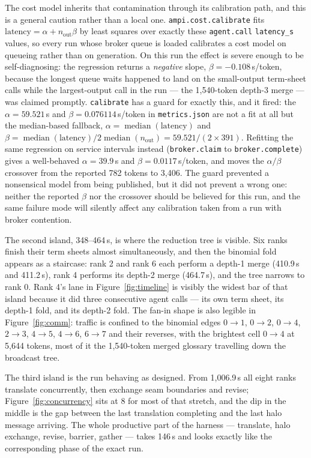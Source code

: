 \documentclass[11pt]{article}
\begin{document}
The cost model inherits that contamination through its calibration path, and this is a general
caution rather than a local one. \texttt{ampi.cost.calibrate} fits $\text{latency} =
\alpha + n_{\text{out}}\beta$ by least squares over exactly these \texttt{agent.call}
\texttt{latency\_s} values, so every run whose broker queue is loaded calibrates a cost model on
queueing rather than on generation. On this run the effect is severe enough to be
self-diagnosing: the regression returns a \emph{negative} slope, $\beta=-0.108$\,s/token,
because the longest queue waits happened to land on the small-output term-sheet calls while the
largest-output call in the run --- the 1{,}540-token depth-3 merge --- was claimed promptly.
\texttt{calibrate} has a guard for exactly this, and it fired: the $\alpha=59.521$\,s and
$\beta=0.076114$\,s/token in \texttt{metrics.json} are not a fit at all but the median-based
fallback, $\alpha=\operatorname{median}(\text{latency})$ and
$\beta=\operatorname{median}(\text{latency})/2\operatorname{median}(n_{\text{out}})
= 59.521/(2\times391)$. Refitting the same regression on service intervals instead
(\texttt{broker.claim} to \texttt{broker.complete}) gives a well-behaved $\alpha=39.9$\,s and
$\beta=0.0117$\,s/token, and moves the $\alpha/\beta$ crossover from the reported 782 tokens to
3{,}406. The guard prevented a nonsensical model from being published, but it did not prevent a
wrong one: neither the reported $\beta$ nor the crossover should be believed for this run, and
the same failure mode will silently affect any calibration taken from a run with broker
contention.

The second island, 348--464\,s, is where the reduction tree is visible. Six ranks finish their
term sheets almost simultaneously, and then the binomial fold appears as a staircase: rank 2 and
rank 6 each perform a depth-1 merge (410.9\,s and 411.2\,s), rank 4 performs its depth-2 merge
(464.7\,s), and the tree narrows to rank 0. Rank 4's lane in Figure~\ref{fig:timeline} is
visibly the widest bar of that island because it did three consecutive agent calls --- its own
term sheet, its depth-1 fold, and its depth-2 fold. The fan-in shape is also legible in
Figure~\ref{fig:comm}: traffic is confined to the binomial edges $0\!\to\!1$, $0\!\to\!2$,
$0\!\to\!4$, $2\!\to\!3$, $4\!\to\!5$, $4\!\to\!6$, $6\!\to\!7$ and their reverses, with the
brightest cell $0\!\to\!4$ at 5{,}644 tokens, most of it the 1{,}540-token merged glossary
travelling down the broadcast tree.

The third island is the run behaving as designed. From 1{,}006.9\,s all eight ranks translate
concurrently, then exchange seam boundaries and revise; Figure~\ref{fig:concurrency} sits at 8
for most of that stretch, and the dip in the middle is the gap between the last translation
completing and the last halo message arriving. The whole productive part of the harness ---
translate, halo exchange, revise, barrier, gather --- takes 146\,s and looks exactly like the
corresponding phase of the exact run.
\end{document}
